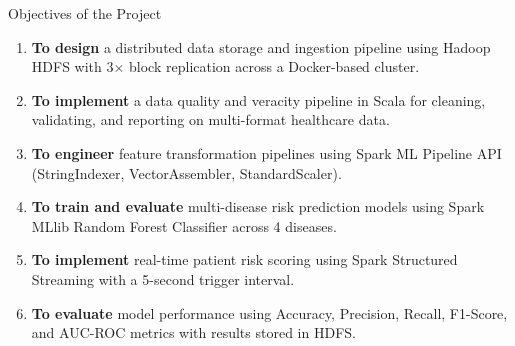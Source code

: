 \documentclass[aspectratio=169, 11pt]{beamer}
\begin{document}
\begin{frame}{Objectives of the Project}

\vspace{0.3cm}
\begin{enumerate}
  \setlength{\itemsep}{0.35cm}

  \item[\textcolor{msTeal}{\textbf{O1}}]
    \textbf{To design} a distributed data storage and ingestion pipeline using Hadoop HDFS with 3$\times$ block replication across a Docker-based cluster.

  \item[\textcolor{msTeal}{\textbf{O2}}]
    \textbf{To implement} a data quality and veracity pipeline in Scala for cleaning, validating, and reporting on multi-format healthcare data.

  \item[\textcolor{msTeal}{\textbf{O3}}]
    \textbf{To engineer} feature transformation pipelines using Spark ML Pipeline API (StringIndexer, VectorAssembler, StandardScaler).

  \item[\textcolor{msTeal}{\textbf{O4}}]
    \textbf{To train and evaluate} multi-disease risk prediction models using Spark MLlib Random Forest Classifier across 4 diseases.

  \item[\textcolor{msTeal}{\textbf{O5}}]
    \textbf{To implement} real-time patient risk scoring using Spark Structured Streaming with a 5-second trigger interval.

  \item[\textcolor{msTeal}{\textbf{O6}}]
    \textbf{To evaluate} model performance using Accuracy, Precision, Recall, F1-Score, and AUC-ROC metrics with results stored in HDFS.

\end{enumerate}

\end{frame}
\end{document}
